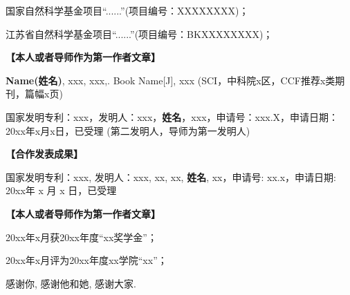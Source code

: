 

\project
\thispagestyle{onlytitle}
\begin{enumerate}[{[1]}]
	\item 国家自然科学基金项目“......”(项目编号：XXXXXXXX)；
	\item 江苏省自然科学基金项目“......”(项目编号：BKXXXXXXXX)；
\end{enumerate}


\achievement
\thispagestyle{onlytitle}
 \textbf{【本人或者导师作为第一作者文章】}
\begin{enumerate}[{[1]}]
	\item   \textbf{Name(姓名)}, xxx, xxx,. Book Name[J], xxx (SCI，中科院x区，CCF推荐x类期刊，篇幅x页)
	\item 国家发明专利：xxx，发明人：xxx，\textbf{姓名}，xxx，申请号：xxx.X，申请日期：20xx年x月x日，已受理 (第二发明人，导师为第一发明人)
\end{enumerate}
\par
 \textbf{【合作发表成果】}
\begin{enumerate}[{[1]}]
	\item   国家发明专利：xxx, 发明人：xxx, xx, xx, \textbf{姓名}, xx，申请号: xx.x，申请日期: 20xx年 x 月 x 日，已受理
\end{enumerate}


\awards
\thispagestyle{onlytitle}
\textbf{【本人或者导师作为第一作者文章】}
\begin{enumerate}[{[1]}]
	\item 20xx年x月获20xx年度“xx奖学金”；
	\item 20xx年x月评为20xx年度xx学院“xx”；
\end{enumerate}

\acknowledgement
\thispagestyle{onlytitle}

感谢你, 感谢他和她, 感谢大家.

  \iflib
  \else
  \newpage
  \cleardoublepage
  \fi








